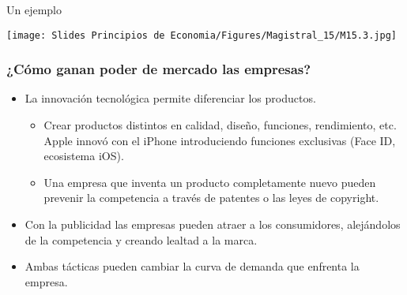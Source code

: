 \documentclass{beamer}
\begin{document}
\begin{frame}{Un ejemplo}

\centering
\texttt{[image: Slides Principios de Economia/Figures/Magistral\_15/M15.3.jpg]}

\end{frame}

\begin{frame}
\frametitle{¿Cómo ganan poder de mercado las empresas?}
\begin{itemize}
    \item La innovación tecnológica permite diferenciar los productos.
    \begin{itemize}
        \item Crear productos distintos en calidad, diseño, funciones, rendimiento, etc. Apple innovó con el iPhone introduciendo funciones exclusivas (Face ID, ecosistema iOS).
        \item Una empresa que inventa un producto completamente nuevo pueden prevenir la competencia a través de patentes o las leyes de copyright. \vspace{1mm}
  \end{itemize}
        \item Con la publicidad las empresas pueden atraer a los consumidores, alejándolos de la competencia y creando lealtad a la marca. \vspace{1mm}
        \item Ambas tácticas pueden cambiar la curva de demanda que enfrenta la empresa. 
\end{itemize}
\end{frame}
\end{document}

